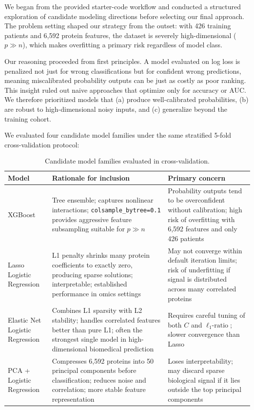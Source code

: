 \documentclass[11pt]{article}
\begin{document}
We began from the provided starter-code workflow and conducted a structured exploration of candidate modeling directions before selecting our final approach. The problem setting shaped our strategy from the outset: with 426 training patients and 6,592 protein features, the dataset is severely high-dimensional ($p \gg n$), which makes overfitting a primary risk regardless of model class.


Our reasoning proceeded from first principles. A model evaluated on log loss is penalized not just for wrong classifications but for confident wrong predictions, meaning miscalibrated probability outputs can be just as costly as poor ranking. This insight ruled out naive approaches that optimize only for accuracy or AUC. We therefore prioritized models that (a) produce well-calibrated probabilities, (b) are robust to high-dimensional noisy inputs, and (c) generalize beyond the training cohort.


We evaluated four candidate model families under the same stratified 5-fold cross-validation protocol:

\begin{table}[h]
\centering
\begin{tabular}{p{2.8cm}p{3.2cm}p{3cm}}
\toprule
\textbf{Model} & \textbf{Rationale for inclusion} & \textbf{Primary concern} \\
\midrule
XGBoost & Tree ensemble; captures nonlinear interactions; \texttt{colsample\_bytree=0.1} provides aggressive feature subsampling suitable for $p \gg n$ & Probability outputs tend to be overconfident without calibration; high risk of overfitting with 6,592 features and only 426 patients \\
Lasso Logistic Regression & L1 penalty shrinks many protein coefficients to exactly zero, producing sparse solutions; interpretable; established performance in omics settings & May not converge within default iteration limits; risk of underfitting if signal is distributed across many correlated proteins \\
Elastic Net Logistic Regression & Combines L1 sparsity with L2 stability; handles correlated features better than pure L1; often the strongest single model in high-dimensional biomedical prediction & Requires careful tuning of both $C$ and $\ell_1\text{-ratio}$; slower convergence than Lasso \\
PCA + Logistic Regression & Compresses 6,592 proteins into 50 principal components before classification; reduces noise and correlation; more stable feature representation & Loses interpretability; may discard sparse biological signal if it lies outside the top principal components \\
\bottomrule
\end{tabular}
\caption{Candidate model families evaluated in cross-validation.}
\label{tab:candidates}
\end{table}
\end{document}
